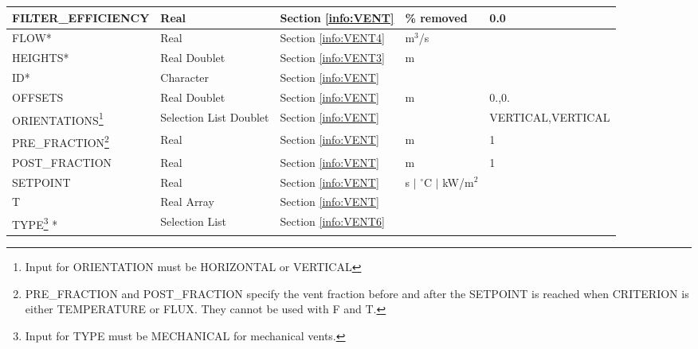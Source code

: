 \begin{minipage}{6.5in}
\begin{longtable}{@{\extracolsep{\fill}}|l|l|l|l|l|}
{\ct FILTER\_EFFICIENCY}    					 & Real  		  & Section \ref{info:VENT}      & \% removed                            &  0.0               \\ \hline
{\ct FLOW}*      	 					 & Real  		  & Section \ref{info:VENT4}     & m$^3$/s                     &                 \\ \hline
{\ct HEIGHTS}*      					 & Real Doublet  	  & Section \ref{info:VENT3}     & m                           &                 \\ \hline
{\ct ID}*                                                         & Character  	          & Section \ref{info:VENT}      &                             &                 \\ \hline
{\ct OFFSETS}       					 & Real Doublet 		  & Section \ref{info:VENT}      & m                           &      0.,0.        \\ \hline
{\ct ORIENTATIONS}\footnote{Input for {\ct ORIENTATION} must be {\ct HORIZONTAL} or {\ct VERTICAL}}  					 & Selection List Doublet 		  & Section \ref{info:VENT}      &                             & {\tiny VERTICAL,VERTICAL}                \\ \hline
{\ct PRE\_FRACTION}\footnote{{\ct PRE\_FRACTION} and {\ct POST\_FRACTION} specify the vent fraction before and after the {\ct SETPOINT} is reached when {\ct CRITERION} is either {\ct TEMPERATURE} or {\ct FLUX}. They cannot be used with {\ct F} and {\ct T}.}       					 & Real 		  & Section \ref{info:VENT}      & m                           &      1        \\ \hline
{\ct POST\_FRACTION}       					 & Real 		  & Section \ref{info:VENT}      & m                           &      1        \\ \hline
{\ct SETPOINT}           					 & Real  	          & Section \ref{info:VENT}      & s $\mid$ $^\circ$C $\mid$ kW/m$^2$ &                 \\ \hline
{\ct T}  					 & Real Array  		  & Section \ref{info:VENT}      &                             &                 \\ \hline
{\ct TYPE}\footnote{Input for {\ct TYPE} must be {\ct MECHANICAL} for mechanical vents.} *
                                                                 & Selection List         & Section \ref{info:VENT6}     &                             &                 \\ \hline
\end{longtable}
\end{minipage}

